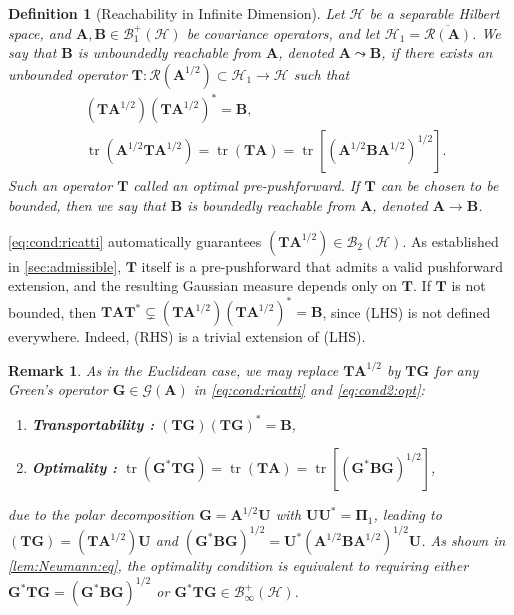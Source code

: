 \documentclass[noinfoline]{imsart}\setcounter{tocdepth}{2}
\newcommand{\m}[1]{\mathbf{#1}} %
\renewcommand{\c}[1]{\mathcal{#1}} %
\DeclareMathOperator*{\tr}{tr}
\theoremstyle{plain}
\newtheorem{definition}{Definition}[section]
\newtheorem{remark}{Remark}[section]
\begin{document}
\begin{definition}[Reachability in Infinite Dimension]\label{def:inf:reach}
Let $\c{H}$ be a separable Hilbert space, and $\m{A}, \m{B} \in \c{B}_{1}^{+}(\c{H})$ be covariance operators, and let $\c{H}_{1} = \overline{\c{R}(\m{A})}$. We say that $\m{B}$ is \emph{unboundedly reachable} from $\m{A}$, denoted $\m{A} \leadsto \m{B}$, if there exists an unbounded operator $\m{T}: \c{R}(\m{A}^{1/2}) \subset \c{H}_{1} \rightarrow \c{H}$ such that
\begin{align}
    &(\m{T} \m{A}^{1/2}) (\m{T} \m{A}^{1/2})^{*} = \m{B}, \label{eq:cond:ricatti} \\ 
    &\tr (\m{A}^{1/2} \m{T} \m{A}^{1/2}) = \tr (\m{T} \m{A}) = \tr [(\m{A}^{1/2} \m{B} \m{A}^{1/2})^{1/2}]. \label{eq:cond2:opt}
\end{align}
Such an operator $\m{T}$ called an \emph{optimal pre-pushforward}.
If $\m{T}$ can be chosen to be bounded, then we say that $\m{B}$ is \emph{boundedly reachable} from $\m{A}$, denoted $\m{A} \rightarrow \m{B}$.
\end{definition}

\eqref{eq:cond:ricatti} automatically guarantees $(\m{T} \m{A}^{1/2}) \in \c{B}_{2}(\c{H})$. As established in \cref{sec:admissible}, $\m{T}$ itself is a pre-pushforward that admits a valid pushforward extension, and the resulting Gaussian measure depends only on $\m{T}$. If $\m{T}$ is not bounded, then $\m{T} \m{A} \m{T}^{*} \subsetneq (\m{T} \m{A}^{1/2}) (\m{T} \m{A}^{1/2})^{*} = \m{B}$, since (LHS) is not defined everywhere. Indeed, (RHS) is a trivial extension of (LHS).


\begin{remark}
As in the Euclidean case, we may replace $\m{T} \m{A}^{1/2}$ by $\m{T} \m{G}$ for any Green's operator $\m{G} \in \c{G}(\m{A})$ in \eqref{eq:cond:ricatti} and \eqref{eq:cond2:opt}:
\begin{enumerate}
    \item [] \textbf{Transportability :} $(\m{T} \m{G}) (\m{T} \m{G})^{*} = \m{B}$,
    \item [] \textbf{Optimality :} $\tr (\m{G}^{*} \m{T} \m{G}) = \tr (\m{T} \m{A}) = \tr [(\m{G}^{*} \m{B} \m{G})^{1/2}]$, 
\end{enumerate}
due to the polar decomposition $\m{G} = \m{A}^{1/2} \m{U}$ with $\m{U} \m{U}^{*} = \m{\Pi}_{1}$, leading to $(\m{T} \m{G}) = (\m{T} \m{A}^{1/2}) \m{U}$ and $(\m{G}^{*} \m{B} \m{G})^{1/2} = \m{U}^{*} (\m{A}^{1/2} \m{B} \m{A}^{1/2})^{1/2} \m{U}$. 
As shown in \cref{lem:Neumann:eq}, the optimality condition is equivalent to requiring either $\m{G}^{*} \m{T} \m{G} = (\m{G}^{*} \m{B} \m{G})^{1/2}$ or $\m{G}^{*} \m{T} \m{G} \in \c{B}_{\infty}^{+}(\c{H})$.
\end{remark}
\end{document}
